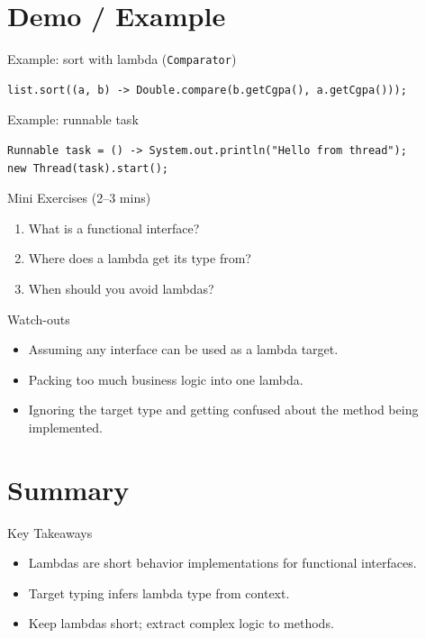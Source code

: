 \documentclass{beamer}
\begin{document}
\section{Demo / Example}
\label{sec:demo}

\begin{frame}[fragile]{Example: sort with lambda (\texttt{Comparator})}
\begin{lstlisting}
list.sort((a, b) -> Double.compare(b.getCgpa(), a.getCgpa()));
\end{lstlisting}
  \slidesources{\OOPSUnitIVSources}
\end{frame}

\begin{frame}[fragile]{Example: runnable task}
\begin{lstlisting}
Runnable task = () -> System.out.println("Hello from thread");
new Thread(task).start();
\end{lstlisting}
  \slidesources{\OOPSUnitIVSources}
\end{frame}

\begin{frame}{Mini Exercises (2--3 mins)}
  \begin{enumerate}[<+->]
    \item What is a functional interface?
    \item Where does a lambda get its type from?
    \item When should you avoid lambdas?
  \end{enumerate}
  \slidesources{\OOPSUnitIVSources}
\end{frame}

\begin{frame}{Watch-outs}
\begin{itemize}[<+->]
  \item Assuming any interface can be used as a lambda target.
  \item Packing too much business logic into one lambda.
  \item Ignoring the target type and getting confused about the method being implemented.
\end{itemize}
  \slidesources{\OOPSUnitIVSources}
\end{frame}

\section{Summary}
\label{sec:summary}

\begin{frame}{Key Takeaways}
  \begin{itemize}[<+->]
    \item Lambdas are short behavior implementations for functional interfaces.
    \item Target typing infers lambda type from context.
    \item Keep lambdas short; extract complex logic to methods.
  \end{itemize}
  \slidesources{\OOPSUnitIVSources}
\end{frame}
\end{document}
